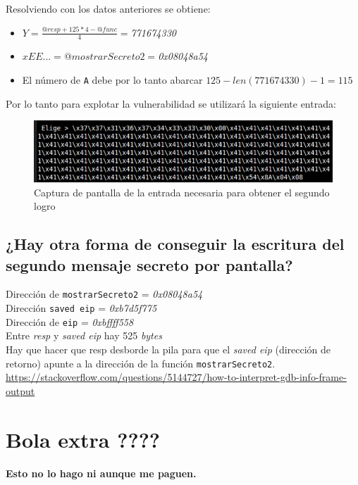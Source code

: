 \documentclass[10pt,a4paper]{article}
\begin{document}
Resolviendo con los datos anteriores se obtiene:
\begin{itemize}
\item $Y=\frac{@resp + 125*4 - @func}{4}=$\emph{771674330}
\item $xEE...=@mostrarSecreto2=$\emph{0x08048a54}
\item El número de \texttt{A} debe por lo tanto abarcar $125-len(771674330)-1=115$
\end{itemize}

Por lo tanto para explotar la vulnerabilidad se utilizará la siguiente entrada:

\begin{figure}[h!]
\centering
\includegraphics[scale=0.9]{images/input_segundo_logro.png}
\caption{Captura de pantalla de la entrada necesaria para obtener el segundo logro}
\label{fig:inputSegundoLogro}
\end{figure}


\subsection{¿Hay otra forma de conseguir la escritura del segundo mensaje secreto por pantalla?}

Dirección de \texttt{mostrarSecreto2} = \emph{0x08048a54}\\
Dirección \texttt{saved eip} = \emph{0xb7d5f775}\\
Dirección de \texttt{eip} = \emph{0xbffff558}\\
Entre \emph{resp} y \emph{saved eip} hay 525 \emph{bytes}\\
Hay que hacer que resp desborde la pila para que el \emph{saved eip} (dirección de retorno) apunte a la dirección de la función \texttt{mostrarSecreto2}. \\


\url{https://stackoverflow.com/questions/5144727/how-to-interpret-gdb-info-frame-output}


\section{Bola extra ????}

\textbf{{\Huge Esto no lo hago ni aunque me paguen.}}
\end{document}

